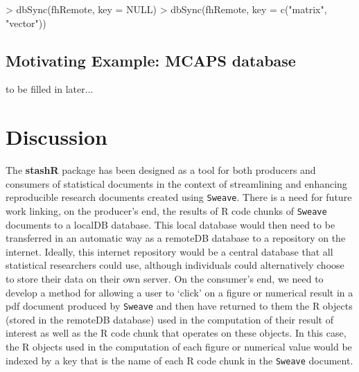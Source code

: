 \documentclass{article}
\newcommand{\pkg}{\textbf}
\newcommand{\code}{\texttt}
\begin{document}
\begin{Schunk}
\begin{Sinput}
> dbSync(fhRemote, key = NULL)
> dbSync(fhRemote, key = c("matrix", "vector"))
\end{Sinput}
\end{Schunk}


\subsection{Motivating Example: MCAPS database} 

to be filled in later...
 
\section{Discussion}

The \pkg{stashR} package has been designed as a
tool for both producers and consumers of statistical documents in
the context of streamlining and enhancing reproducible research
documents created using \code{Sweave}. There is a need for future 
work linking, on the producer's end, the results of R code chunks 
of \code{Sweave} documents to a localDB database. This local 
database would then need to be transferred in an automatic way as a
remoteDB database to a repository on the internet. Ideally,
this internet repository would be a central database that all
statistical researchers could use, although individuals could 
alternatively choose to store their data on their own server. On the
consumer's end, we need to develop a method for allowing a user to
`click' on a figure or numerical result in a pdf document produced
by \code{Sweave} and then have returned to them the R objects
(stored in the remoteDB database) used in the computation of
their result of interest as well as the R code chunk that operates
on these objects. In this case, the R objects used in the
computation of each figure or numerical value would be indexed by
a key that is the name of each R code chunk in the \code{Sweave}
document.




%
%
\end{document}
